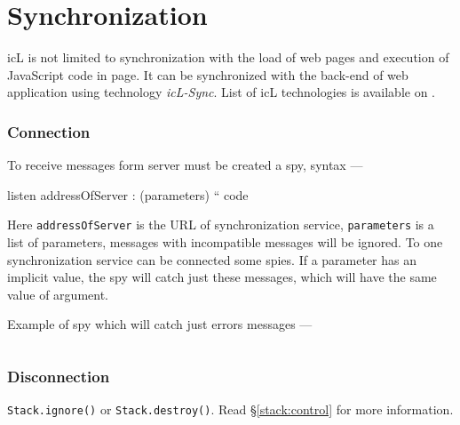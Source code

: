\section{Synchronization}
\label{sync}

icL is not limited to synchronization with the load of web pages and execution of JavaScript code in page. It can be synchronized with the back-end of web application using technology \textit{icL-Sync}. List of icL technologies is available on .

\subsubsection{Connection}

To receive messages form server must be created a spy, syntax —
\begin{iclcode}
listen addressOfServer : (parameters) {
	`` code
}
\end{iclcode}

Here \texttt{addressOfServer} is the URL of synchronization service, \texttt{parameters} is a list of parameters, messages with incompatible messages will be ignored. To one synchronization service can be connected some spies. If a parameter has an implicit value, the spy will catch just these messages, which will have the same value of argument. 

Example of spy which will catch just errors messages —
\inputminted[linenos]{icl}{../sources/errorcatch.icL}

\subsubsection{Disconnection} \texttt{Stack.ignore()} or \texttt{Stack.destroy()}. Read §\ref{stack:control} for more information.
